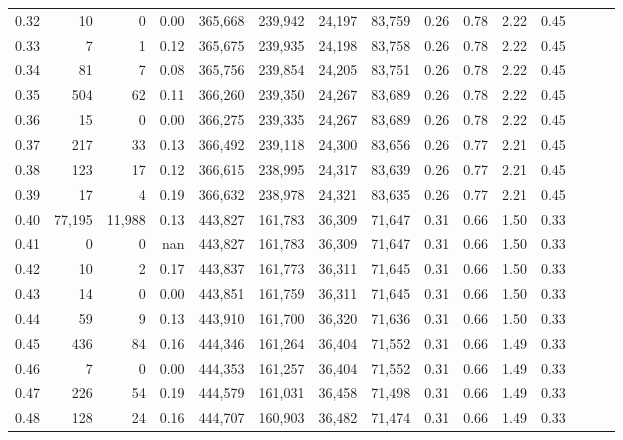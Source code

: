 \begin{tabular}{rrrrrrrrrrrrrrr}
0.32 &      10 &       0 &  0.00 &  365,668 &  239,942 &   24,197 &   83,759 &  0.26 &  0.78 &  2.22 &      0.45 \\
0.33 &       7 &       1 &  0.12 &  365,675 &  239,935 &   24,198 &   83,758 &  0.26 &  0.78 &  2.22 &      0.45 \\
0.34 &      81 &       7 &  0.08 &  365,756 &  239,854 &   24,205 &   83,751 &  0.26 &  0.78 &  2.22 &      0.45 \\
0.35 &     504 &      62 &  0.11 &  366,260 &  239,350 &   24,267 &   83,689 &  0.26 &  0.78 &  2.22 &      0.45 \\
0.36 &      15 &       0 &  0.00 &  366,275 &  239,335 &   24,267 &   83,689 &  0.26 &  0.78 &  2.22 &      0.45 \\
0.37 &     217 &      33 &  0.13 &  366,492 &  239,118 &   24,300 &   83,656 &  0.26 &  0.77 &  2.21 &      0.45 \\
0.38 &     123 &      17 &  0.12 &  366,615 &  238,995 &   24,317 &   83,639 &  0.26 &  0.77 &  2.21 &      0.45 \\
0.39 &      17 &       4 &  0.19 &  366,632 &  238,978 &   24,321 &   83,635 &  0.26 &  0.77 &  2.21 &      0.45 \\
0.40 &  77,195 &  11,988 &  0.13 &  443,827 &  161,783 &   36,309 &   71,647 &  0.31 &  0.66 &  1.50 &      0.33 \\
0.41 &       0 &       0 &   nan &  443,827 &  161,783 &   36,309 &   71,647 &  0.31 &  0.66 &  1.50 &      0.33 \\
0.42 &      10 &       2 &  0.17 &  443,837 &  161,773 &   36,311 &   71,645 &  0.31 &  0.66 &  1.50 &      0.33 \\
0.43 &      14 &       0 &  0.00 &  443,851 &  161,759 &   36,311 &   71,645 &  0.31 &  0.66 &  1.50 &      0.33 \\
0.44 &      59 &       9 &  0.13 &  443,910 &  161,700 &   36,320 &   71,636 &  0.31 &  0.66 &  1.50 &      0.33 \\
0.45 &     436 &      84 &  0.16 &  444,346 &  161,264 &   36,404 &   71,552 &  0.31 &  0.66 &  1.49 &      0.33 \\
0.46 &       7 &       0 &  0.00 &  444,353 &  161,257 &   36,404 &   71,552 &  0.31 &  0.66 &  1.49 &      0.33 \\
0.47 &     226 &      54 &  0.19 &  444,579 &  161,031 &   36,458 &   71,498 &  0.31 &  0.66 &  1.49 &      0.33 \\
0.48 &     128 &      24 &  0.16 &  444,707 &  160,903 &   36,482 &   71,474 &  0.31 &  0.66 &  1.49 &      0.33 \\

\end{tabular}
